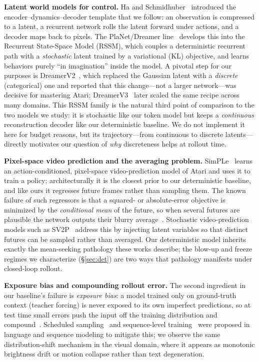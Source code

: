 \documentclass[10pt,twocolumn,letterpaper]{article}
\begin{document}
\textbf{Latent world models for control.} Ha and
Schmidhuber~\cite{ha2018worldmodels} introduced the
encoder--dynamics--decoder template that we follow: an observation is compressed
to a latent, a recurrent network rolls the latent forward under actions, and a
decoder maps back to pixels. The PlaNet/Dreamer
line~\cite{hafner2019planet,hafner2020dreamer,hafner2021dreamerv2,hafner2023dreamerv3}
develops this into the Recurrent State-Space Model (RSSM), which couples a
deterministic recurrent path with a \emph{stochastic} latent trained by a
variational (KL) objective, and learns behaviors purely ``in imagination''
inside the model. A pivotal step for our purposes is
DreamerV2~\cite{hafner2021dreamerv2}, which replaced the Gaussian latent with a
\emph{discrete} (categorical) one and reported that this change---not a larger
network---was decisive for mastering Atari; DreamerV3~\cite{hafner2023dreamerv3}
later scaled the same recipe across many domains. This RSSM family is the
natural third point of comparison to the two models we study: it is stochastic
like our token model but keeps a \emph{continuous} reconstruction decoder like
our deterministic baseline. We do not implement it here for budget reasons, but
its trajectory---from continuous to discrete latents---directly motivates our
question of \emph{why} discreteness helps at rollout time.

\textbf{Pixel-space video prediction and the averaging problem.}
SimPLe~\cite{kaiser2020simple} learns an action-conditioned, pixel-space
video-prediction model of Atari and uses it to train a policy; architecturally
it is the closest prior to our deterministic baseline, and like ours it
regresses future frames rather than sampling them. The known failure of such
regressors is that a squared- or absolute-error objective is minimized by the
\emph{conditional mean} of the future, so when several futures are plausible the
network outputs their blurry average~\cite{mathieu2016deep}. Stochastic
video-prediction models such as SV2P~\cite{babaeizadeh2018stochastic} address
this by injecting latent variables so that distinct futures can be sampled
rather than averaged. Our deterministic model inherits exactly the mean-seeking
pathology these works describe; the blow-up and freeze regimes we characterize
(\S\ref{sec:det}) are two ways that pathology manifests under closed-loop
rollout.

\textbf{Exposure bias and compounding rollout error.} The second ingredient in
our baseline's failure is \emph{exposure bias}: a model trained only on
ground-truth context (teacher forcing) is never exposed to its own imperfect
predictions, so at test time small errors push the input off the training
distribution and compound~\cite{bengio2015scheduled,ranzato2016sequence}.
Scheduled sampling~\cite{bengio2015scheduled} and sequence-level
training~\cite{ranzato2016sequence} were proposed in language and sequence
modeling to mitigate this; we observe the same distribution-shift mechanism in
the visual domain, where it appears as monotonic brightness drift or motion
collapse rather than text degeneration.
\end{document}
